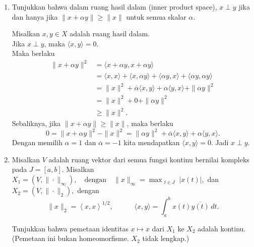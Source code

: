 \documentclass{article}
\theoremstyle{definition}
\begin{document}
\begin{enumerate}
  \item Tunjukkan bahwa dalam ruang hasil dalam (inner product space), $x \perp y$ jika dan hanya jika $\|x + \alpha y\| \geq \|x\|$ untuk semua skalar $\alpha$.
  \begin{solution}
    Misalkan $x,y\in X$ adalah ruang hasil dalam.\\
    Jika $x\perp y$, maka $\langle x,y \rangle=0$.\\
    Maka berlaku
    \begin{align*}
      \|x+\alpha y\|^2&=\langle x+\alpha y,x+\alpha y \rangle\\
      &=\langle x,x \rangle+\langle x,\alpha y \rangle+\langle \alpha y,x \rangle+\langle \alpha y,\alpha y \rangle\\
      &=\|x\|^2+\overline{\alpha}\langle x,y \rangle+\alpha\langle y,x \rangle+\|\alpha y\|^2\\
      &=\|x\|^2+0+\|\alpha y\|^2\\
      &\geq \|x\|^2.
    \end{align*}
    Sebaliknya, jika $\|x+\alpha y\|\geq \|x\|$, maka berlaku
    \[
    0=\|x+\alpha y\|^2-\|x\|^2=\|\alpha y\|^2+\overline{\alpha}\langle x,y\rangle+\alpha\langle y,x\rangle.
    \]
    Dengan memilih $\alpha=1$ dan $\overline{\alpha}=-1$ kita mendapatkan $\langle x,y\rangle=0$. Jadi $x\perp y$.
  \end{solution}

  \item Misalkan $V$ adalah ruang vektor dari semua fungsi kontinu bernilai kompleks pada $J = [a,b]$. Misalkan
  $\displaystyle
  X_1 = (V, \|\cdot\|_\infty), \quad \text{dengan} \quad \|x\|_\infty = \max_{\substack{t \in J}} |x(t)|,
  $
  dan
  $
  X_2 = (V, \|\cdot\|_2),
  $
  dengan
  \[
  \|x\|_2 = \left\langle x, x \right\rangle^{1/2}, \quad \quad \quad \langle x, y \rangle = \int_a^b x(t)\overline{y(t)} \, dt.
  \]

  Tunjukkan bahwa pemetaan identitas $x \mapsto x$ dari $X_1$ ke $X_2$ adalah kontinu. (Pemetaan ini bukan homeomorfisme. $X_2$ tidak lengkap.)
\end{enumerate}
\end{document}
